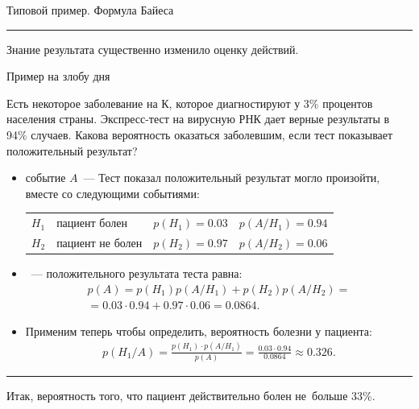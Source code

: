 \documentclass[unicode,11pt,notheorems,xcolor=table]{beamer}
\begin{document}
\begin{frame}[allowframebreaks]{Типовой пример. Формула Байеса}{}
\begin{itemize}
        \hrule
        
        \medskip
        Знание результата существенно изменило оценку действий.
        
    \end{itemize}
 \end{frame}

\begin{frame}[allowframebreaks]{Пример на злобу дня}
    \begin{exampleblock}{}
        Есть некоторое заболевание на К, которое диагностируют у 3\% процентов населения страны. Экспресс-тест на вирусную РНК дает верные результаты в 94\% случаев. Какова вероятность оказаться заболевшим, если тест показывает положительный результат?
    \end{exampleblock}
    \begin{itemize}
        \item {} событие $A$~--- Тест показал положительный результат  могло произойти, вместе со следующими событиями:
        \begin{tabular}{l@{\;---\;}l@{\quad}l@{,\quad}l}
            $H_1$ & пациент болен    & $p(H_1)=0.03$ &$p(A/H_1)=0.94$\\
            $H_2$ & пациент не болен & $p(H_2)=0.97$ & $p(A/H_2)=0.06$\\
        \end{tabular}
        \item {}~--- положительного результата теста равна:
            \begin{multline*}
                p(A)
            =p(H_1)p(A/H_1) + p(H_2)p(A/H_2)
            =\\
            =0.03\cdot 0.94+0.97\cdot 0.06 = 0.0864.
        \end{multline*}
        \item Применим теперь  чтобы определить, вероятность болезни у пациента:
        \begin{multline*}
            p(H_1/A) = \frac{p(H_1)\cdot p(A/H_1)}{p(A)} = \frac{0.03\cdot 0.94}{0.0864}  \approx 0.326.
        \end{multline*}
    \end{itemize}
    
    \medskip
    \hrule
    \medskip

    Итак, вероятность того, что пациент действительно болен не~больше $33\%$.


\end{frame}
\end{document}
